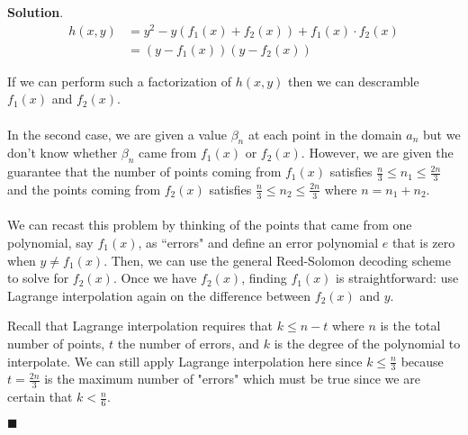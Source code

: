 \documentclass[12pt]{article}
\theoremstyle{definition}
\newenvironment{s}{%
        \begin{trivlist} \item \textbf{Solution}. }{%
            \hspace*{\fill} $\blacksquare$\end{trivlist}}%
\begin{document}
{\begin{s}
\begin{align*}
h(x,y) &= y^{2} - y(f_{1}(x)+f_{2}(x)) + f_{1}(x)\cdot f_{2}(x)\\
&= (y-f_{1}(x))(y-f_{2}(x))
\end{align*}

If we can perform such a factorization of $h(x,y)$ then we can descramble $f_{1}(x)$ and $f_{2}(x)$. 
\\
\\
In the second case, we are given a value $\beta_{n}$ at each point in the domain $a_{n}$ but we don't know whether $\beta_{n}$ came from $f_{1}(x)$ or $f_{2}(x)$. However, we are given the guarantee that the number of points coming from $f_{1}(x)$ satisfies $\frac{n}{3} \leq n_{1} \leq \frac{2n}{3}$ and the points coming from $f_{2}(x)$ satisfies $\frac{n}{3} \leq n_{2} \leq \frac{2n}{3}$ where $n = n_{1} + n_{2}$. 
\\
\\
We can recast this problem by thinking of the points that came from one polynomial, say $f_{1}(x)$, as ``errors" and define an error polynomial $e$ that is zero when $y \neq f_{1}(x)$. Then, we can use the general Reed-Solomon decoding scheme to solve for $f_{2}(x)$. Once we have $f_{2}(x)$, finding $f_{1}(x)$ is straightforward: use Lagrange interpolation again on the difference between $f_{2}(x)$ and $y$. 

Recall that Lagrange interpolation requires that $k\leq n-t$ where $n$ is the total number of points, $t$ the number of errors, and $k$ is the degree of the polynomial to interpolate. We can still apply Lagrange interpolation here since $k \leq \frac{n}{3}$ because $t=\frac{2n}{3}$ is the maximum number of "errors" which must be true since we are certain that $k < \frac{n}{6}$.


\end{s}
\end{document}
